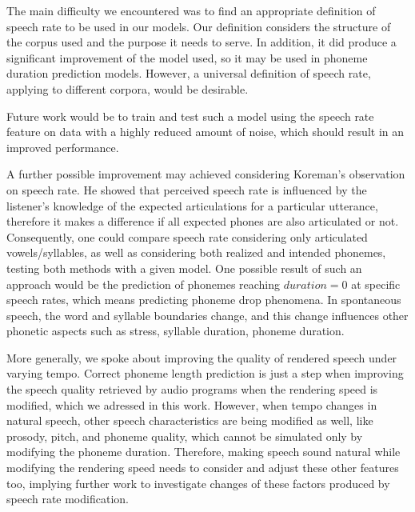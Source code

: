 \documentclass[11pt,a4paper]{scrbook}
\begin{document}
The main difficulty we encountered was to find an appropriate definition of speech rate to be used in our models. Our definition considers the structure of the corpus used and the purpose it needs to serve. In addition, it did produce a significant improvement of the model used, so it may be used in phoneme duration prediction models. However, a universal definition of speech rate, applying to different corpora, would be desirable.

Future work would be to train and test such a model using the speech rate feature on data with a highly reduced amount of noise, which should result in an improved performance. 

A further possible improvement may achieved considering Koreman's observation \cite{Koreman_2006} on speech rate. He showed that perceived speech rate is influenced by the listener's knowledge of the expected articulations for a particular utterance, therefore it makes a difference if all expected phones are also articulated or not. Consequently, one could compare speech rate considering only articulated vowels/syllables, as well as considering both realized and intended phonemes, testing both methods with a given model. One possible result of such an approach would be the prediction of phonemes reaching $duration = 0$ at specific speech rates, which means predicting phoneme drop phenomena. In spontaneous speech, the word and syllable boundaries change, and this change influences other phonetic aspects such as stress, syllable duration, phoneme duration.

More generally, we spoke about improving the quality of rendered speech under varying tempo. Correct phoneme length prediction is just a step when improving the speech quality retrieved by audio programs when the rendering speed is modified, which we adressed in this work. However, when tempo changes in natural speech, other speech characteristics are being modified as well, like prosody, pitch, and phoneme quality, which cannot be simulated only by modifying the phoneme duration. Therefore, making speech sound natural while modifying the rendering speed needs to consider and adjust these other features too, implying further work to investigate changes of these factors produced by speech rate modification.

\printbibliography

\backmatter 

\thispagestyle{empty}
\end{document}
